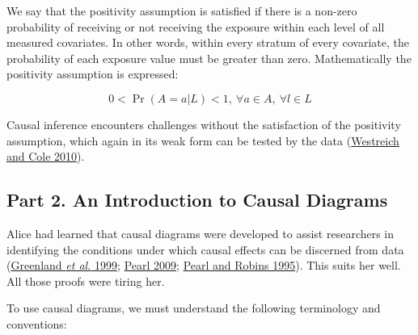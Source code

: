 \documentclass[
  singlecolumn]{article}
\begin{document}
We say that the positivity assumption is satisfied if there is a
non-zero probability of receiving or not receiving the exposure within
each level of all measured covariates. In other words, within every
stratum of every covariate, the probability of each exposure value must
be greater than zero. Mathematically the positivity assumption is
expressed:

\[
0 < \Pr(A=a|L)<1, ~ \forall a \in A, ~ \forall l \in L
\]

Causal inference encounters challenges without the satisfaction of the
positivity assumption, which again in its weak form can be tested by the
data (\protect\hyperlink{ref-westreich2010}{Westreich and Cole 2010}).

\hypertarget{part-2.-an-introduction-to-causal-diagrams}{%
\subsection{Part 2. An Introduction to Causal
Diagrams}\label{part-2.-an-introduction-to-causal-diagrams}}

Alice had learned that causal diagrams were developed to assist
researchers in identifying the conditions under which causal effects can
be discerned from data (\protect\hyperlink{ref-greenland1999}{Greenland
\emph{et al.} 1999}; \protect\hyperlink{ref-pearl2009}{Pearl 2009};
\protect\hyperlink{ref-pearl1995}{Pearl and Robins 1995}). This suits
her well. All those proofs were tiring her.

To use causal diagrams, we must understand the following terminology and
conventions:
\end{document}
